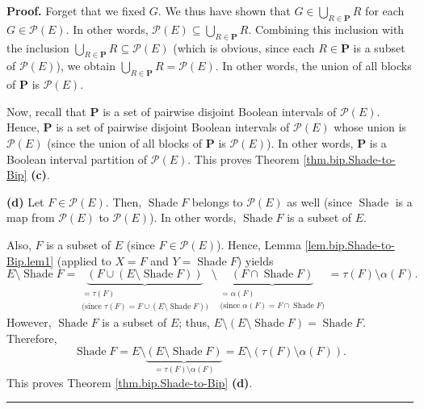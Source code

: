 \documentclass[numbers=enddot,12pt,final,onecolumn]{scrartcl}%
\theoremstyle{definition}
\newenvironment{proof}[1][Proof]{\noindent\textbf{#1.} }{\ \rule{0.5em}{0.5em}}
\let\cupnonlimits\bigcup
\renewcommand{\bigcup}{\cupnonlimits\limits}
\begin{document}
\begin{proof}
Forget that we fixed $G$. We thus have shown that $G\in\bigcup_{R\in
\mathbf{P}}R$ for each $G\in\mathcal{P}\left(  E\right)  $. In other words,
$\mathcal{P}\left(  E\right)  \subseteq\bigcup_{R\in\mathbf{P}}R$. Combining
this inclusion with the inclusion $\bigcup_{R\in\mathbf{P}}R\subseteq
\mathcal{P}\left(  E\right)  $ (which is obvious, since each $R\in\mathbf{P}$
is a subset of $\mathcal{P}\left(  E\right)  $), we obtain $\bigcup
_{R\in\mathbf{P}}R=\mathcal{P}\left(  E\right)  $. In other words, the union
of all blocks of $\mathbf{P}$ is $\mathcal{P}\left(  E\right)  $.

Now, recall that $\mathbf{P}$ is a set of pairwise disjoint Boolean intervals
of $\mathcal{P}\left(  E\right)  $. Hence, $\mathbf{P}$ is a set of pairwise
disjoint Boolean intervals of $\mathcal{P}\left(  E\right)  $ whose union is
$\mathcal{P}\left(  E\right)  $ (since the union of all blocks of $\mathbf{P}$
is $\mathcal{P}\left(  E\right)  $). In other words, $\mathbf{P}$ is a Boolean
interval partition of $\mathcal{P}\left(  E\right)  $. This proves Theorem
\ref{thm.bip.Shade-to-Bip} \textbf{(c)}.

\textbf{(d)} Let $F\in\mathcal{P}\left(  E\right)  $. Then,
$\operatorname*{Shade}F$ belongs to $\mathcal{P}\left(  E\right)  $ as well
(since $\operatorname*{Shade}$ is a map from $\mathcal{P}\left(  E\right)  $
to $\mathcal{P}\left(  E\right)  $). In other words, $\operatorname*{Shade}F$
is a subset of $E$.

Also, $F$ is a subset of $E$ (since $F\in\mathcal{P}\left(  E\right)  $).
Hence, Lemma \ref{lem.bip.Shade-to-Bip.lem1} (applied to $X=F$ and
$Y=\operatorname*{Shade}F$) yields%
\[
E\setminus\operatorname*{Shade}F=\underbrace{\left(  F\cup\left(
E\setminus\operatorname*{Shade}F\right)  \right)  }_{\substack{=\tau\left(
F\right)  \\\text{(since }\tau\left(  F\right)  =F\cup\left(  E\setminus
\operatorname*{Shade}F\right)  \text{)}}}\setminus\underbrace{\left(
F\cap\operatorname*{Shade}F\right)  }_{\substack{=\alpha\left(  F\right)
\\\text{(since }\alpha\left(  F\right)  =F\cap\operatorname*{Shade}F\text{)}%
}}=\tau\left(  F\right)  \setminus\alpha\left(  F\right)  .
\]
However, $\operatorname*{Shade}F$ is a subset of $E$; thus, $E\setminus\left(
E\setminus\operatorname*{Shade}F\right)  =\operatorname*{Shade}F$. Therefore,%
\[
\operatorname*{Shade}F=E\setminus\underbrace{\left(  E\setminus
\operatorname*{Shade}F\right)  }_{=\tau\left(  F\right)  \setminus
\alpha\left(  F\right)  }=E\setminus\left(  \tau\left(  F\right)
\setminus\alpha\left(  F\right)  \right)  .
\]
This proves Theorem \ref{thm.bip.Shade-to-Bip} \textbf{(d)}.
\end{proof}
\end{document}
